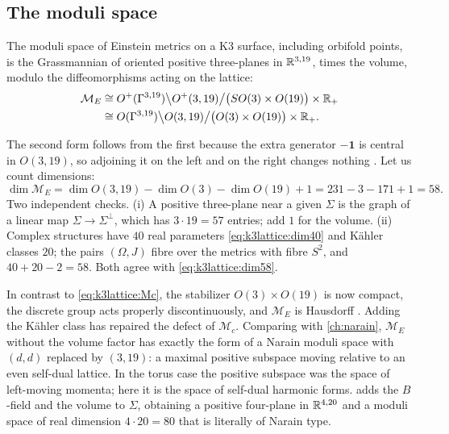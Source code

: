 \subsection{The moduli space}
\begin{theorem}\label{thm:k3lattice:einstein}
The moduli space of Einstein metrics on a K3 surface, including orbifold points, is the
Grassmannian of oriented positive three-planes in $\mathbb{R}^{3,19}$, times the volume, modulo the
diffeomorphisms acting on the lattice:
\begin{equation}\label{eq:k3lattice:ME}
\begin{aligned}
 \mathcal M_E&\cong O^+(\Gamma^{3,19})\big\backslash O^+(3,19)\big/\bigl(SO(3)\times
 O(19)\bigr)\times\mathbb{R}_+\\
 &\cong O(\Gamma^{3,19})\big\backslash O(3,19)\big/\bigl(O(3)\times O(19)\bigr)\times\mathbb{R}_+ .
\end{aligned}
\end{equation}
\TL{} 
\end{theorem}
The second form follows from the first because the extra generator $-\mathbf1$ is central
in $O(3,19)$, so adjoining it on the left and on the right changes nothing
. Let us count dimensions:
\begin{equation}\label{eq:k3lattice:dim58}
 \dim\mathcal M_E=\dim O(3,19)-\dim O(3)-\dim O(19)+1=231-3-171+1=58 .
\end{equation}
Two independent checks. (i) A positive three-plane near a given $\Sigma$ is the graph of a
linear map $\Sigma\to\Sigma^\perp$, which has $3\cdot19=57$ entries; add $1$ for the
volume. (ii) Complex structures have $40$ real parameters \eqref{eq:k3lattice:dim40} and
Kähler classes $20$; the pairs $(\Omega,J)$ fibre over the metrics with fibre $S^2$, and
$40+20-2=58$. Both agree with \eqref{eq:k3lattice:dim58}.

In contrast to \eqref{eq:k3lattice:Mc}, the stabilizer $O(3)\times O(19)$ is now compact, the
discrete group acts properly discontinuously, and $\mathcal M_E$ is Hausdorff
. Adding the Kähler class has repaired the defect of
$\mathcal M_c$. Comparing with \cref{ch:narain}, $\mathcal M_E$ without the volume factor has
exactly the form of a Narain moduli space with $(d,d)$ replaced by $(3,19)$: a maximal
positive subspace moving relative to an even self-dual lattice. In the torus case the
positive subspace was the space of left-moving momenta; here it is the space of self-dual
harmonic forms.  adds the $B$-field and the volume to $\Sigma$, obtaining
a positive four-plane in $\mathbb{R}^{4,20}$ and a moduli space of real dimension $4\cdot20=80$ that
is literally of Narain type.

